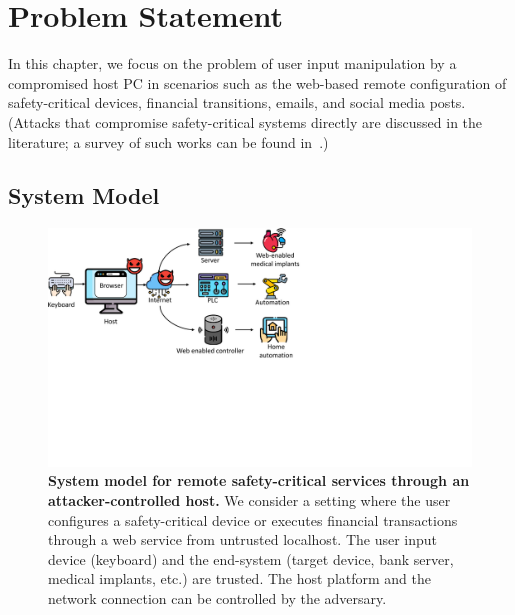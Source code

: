 \section{Problem Statement}
\label{sec:problemStatement_IK}

In this chapter, we focus on the problem of user input manipulation by a compromised host PC in scenarios such as the web-based remote configuration of safety-critical devices, financial transitions, emails, and social media posts. (Attacks that compromise safety-critical systems directly are discussed in the literature; a survey of such works can be found in~\cite{fachkha2017internet}.)



\subsection{System Model}

\begin{figure}[t]
    \centering
    \includegraphics[trim={0 8cm 14cm 0},clip,width=0.9\linewidth]{chapters/IntegriKey/images/Motivation.pdf}
    \caption[System model for remote safety-critical services through an attacker-controlled host]{\textbf{System model for remote safety-critical services through an attacker-controlled host.} We consider a setting where the user configures a safety-critical device or executes financial transactions through a web service from untrusted localhost. The user input device (keyboard) and the end-system (target device, bank server, medical implants, etc.) are trusted. The host platform and the network connection can be controlled by the adversary.} 

    \label{fig:systemModel}
\end{figure}

